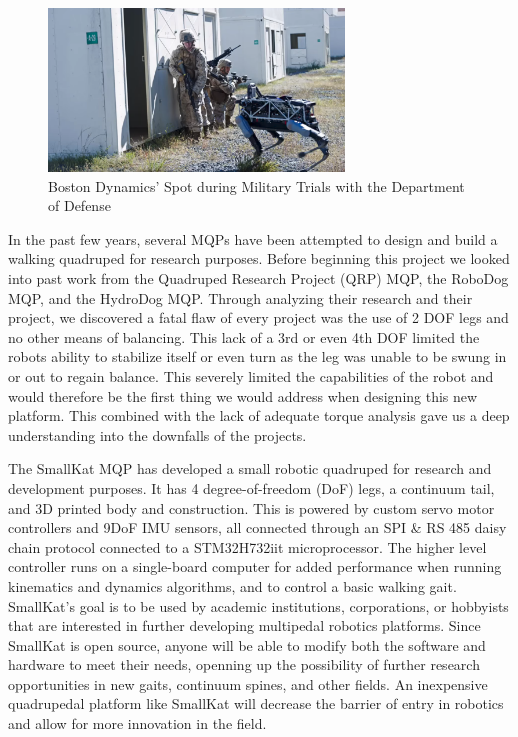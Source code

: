     \begin{figure}
        \centering
        \parbox{0.7\linewidth}{\includegraphics[width=0.7\textwidth]{figures/BostonDynamicsSpotMilitary.png}}
        \caption{Boston Dynamics' Spot during Military Trials with the Department of Defense}
        \label{fig:SpotMilitary} 
    \end{figure}
    
    In the past few years, several MQPs have been attempted to design and build a walking quadruped for research purposes. Before beginning this project we looked into past work from the Quadruped Research Project (QRP) MQP, the RoboDog MQP,\cite{RoboDog_MQP} and the HydroDog MQP. Through analyzing their research and their project, we discovered a fatal flaw of every project was the use of 2 DOF legs and no other means of balancing. This lack of a 3rd or even 4th DOF limited the robots ability to stabilize itself or even turn as the leg was unable to be swung in or out to regain balance. This severely limited the capabilities of the robot and would therefore be the first thing we would address when designing this new platform.  This combined with the lack of adequate torque analysis gave us a deep understanding into the downfalls of the projects. 

    The SmallKat MQP has developed a small robotic quadruped for research and development purposes. It has 4 degree-of-freedom (DoF) legs, a continuum tail, and 3D printed body and construction. This is powered by custom servo motor controllers and 9DoF IMU sensors, all connected through an SPI \& RS 485 daisy chain protocol connected to a STM32H732iit microprocessor. The higher level controller runs on a single-board computer for added performance when running kinematics and dynamics algorithms, and to control a basic walking gait. SmallKat's goal is to be used by academic institutions, corporations, or hobbyists that are interested in further developing multipedal robotics platforms. Since SmallKat is open source, anyone will be able to modify both the software and hardware to meet their needs, openning up the possibility of further research opportunities in new gaits, continuum spines, and other fields. An inexpensive quadrupedal platform like SmallKat will decrease the barrier of entry in robotics and allow for more innovation in the field.

